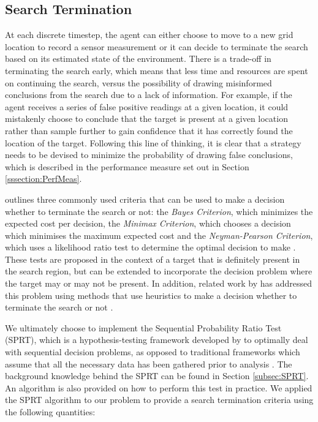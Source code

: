 
\subsection{Search Termination}\label{subsubsec:SeachTerminationMethodology}

At each discrete timestep, the agent can either choose to move to a new grid location to record a sensor measurement or it can decide to terminate the search based on its estimated state of the environment. There is a trade-off in terminating the search early, which means that less time and resources are spent on continuing the search, versus the possibility of drawing misinformed conclusions from the search due to a lack of information. For example, if the agent receives a series of false positive readings at a given location, it could mistakenly choose to conclude that the target is present at a given location rather than sample further to gain confidence that it has correctly found the location of the target. Following this line of thinking, it is clear that a strategy needs to be devised to minimize the probability of drawing false conclusions, which is described in the performance measure set out in Section \ref{sssection:PerfMeas}.\par
\citeauthor{Pollock1971SearchInterfaces} outlines three commonly used criteria that can be used to make a decision whether to terminate the search or not: the \textit{Bayes Criterion}, which minimizes the expected cost per decision, the \textit{Minimax Criterion}, which chooses a decision which minimises the maximum expected cost and the \textit{Neyman-Pearson Criterion}, which uses a likelihood ratio test to determine the optimal decision to make \cite{Pollock1971SearchInterfaces}. These tests are proposed in the context of a target that is definitely present in the search region, but can be extended to incorporate the decision problem where the target may or may not be present. In addition, related work by \citeauthor{Chung2007ASearch} has addressed this problem using methods that use heuristics to make a decision whether to terminate the search or not \cite{Chung2007ASearch}. 

We ultimately choose to implement the Sequential Probability Ratio Test (SPRT), which is a hypothesis-testing framework developed by \citeauthor{Wald1950BayesProblems} to optimally deal with sequential decision problems, as opposed to traditional frameworks which assume that all the necessary data has been gathered prior to analysis \cite{Wald1950BayesProblems}. The background knowledge behind the SPRT can be found in Section \ref{subsec:SPRT}. An algorithm is also provided on how to perform this test in practice.
We applied the SPRT algorithm to our problem to provide a search termination criteria using the following quantities: 

